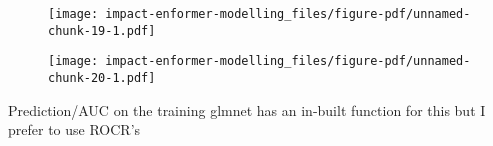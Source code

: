 \documentclass[
  letterpaper,
  DIV=11,
  numbers=noendperiod]{scrartcl}
\newenvironment{Shaded}{\begin{snugshade}}{\end{snugshade}}
\newcommand{\AttributeTok}[1]{\textcolor[rgb]{0.40,0.45,0.13}{#1}}
\newcommand{\FunctionTok}[1]{\textcolor[rgb]{0.28,0.35,0.67}{#1}}
\newcommand{\NormalTok}[1]{\textcolor[rgb]{0.00,0.23,0.31}{#1}}
\newcommand{\SpecialCharTok}[1]{\textcolor[rgb]{0.37,0.37,0.37}{#1}}
\newcommand{\StringTok}[1]{\textcolor[rgb]{0.13,0.47,0.30}{#1}}
\begin{document}
\begin{figure}[H]

{\centering \texttt{[image: impact-enformer-modelling\_files/figure-pdf/unnamed-chunk-19-1.pdf]}

}

\end{figure}

\begin{Shaded}
\end{Shaded}

\begin{figure}[H]

{\centering \texttt{[image: impact-enformer-modelling\_files/figure-pdf/unnamed-chunk-20-1.pdf]}

}

\end{figure}

Prediction/AUC on the training glmnet has an in-built function for this
but I prefer to use ROCR's
\end{document}
